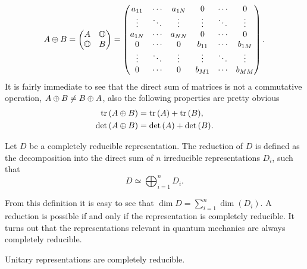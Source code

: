 \begin{equation}
    A \oplus B = 
    \begin{pmatrix}
        A & \mathbb{O} \\
        \mathbb{O} & B
    \end{pmatrix} =
    \begin{pmatrix}
        a_{11} & \cdots & a_{1N} & 0 & \cdots & 0 \\
        \vdots & \ddots & \vdots & \vdots & \ddots & \vdots \\
        a_{1N} & \cdots & a_{NN} & 0 & \cdots & 0 \\
        0 & \cdots & 0 & b_{11} & \cdots & b_{1M} \\
        \vdots & \ddots & \vdots & \vdots & \ddots & \vdots \\
        0 & \cdots & 0 & b_{M1} & \cdots & b_{MM} \\
    \end{pmatrix}.
\end{equation}
It is fairly immediate to see that the direct sum of matrices is not a commutative operation, $A \oplus B \neq B \oplus A$, also the following properties are pretty obvious
\begin{align}
    \mathrm{tr}\,{(A \oplus B)} &= \mathrm{tr}\,{(A)} + \mathrm{tr}\,{(B)}, \\
    \det{(A \oplus B)} &= \det{(A)} + \det{(B)}.
\end{align}
\begin{defn}
    Let $D$ be a completely reducible representation. The reduction of $D$ is defined as the decomposition into the direct sum of $n$ irreducible representations $D_i$, such that
    \begin{equation}
        D \simeq \bigoplus_{i = 1}^nD_i.
    \end{equation}
\end{defn}
From this definition it is easy to see that $\dim{D} = \sum_{i=1}^n\dim{(D_i)}$. A reduction is possible if and only if the representation is completely reducible. It turns out that the representations relevant in quantum mechanics are always completely reducible.
\begin{teo}
\label{teo: reducibility of unitary representations}
    Unitary representations are completely reducible.
\end{teo}
